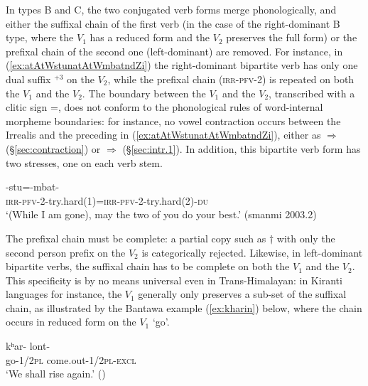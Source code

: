  In types B and C, the two conjugated verb forms merge phonologically, and either the suffixal chain of the first verb (in the case of the right-dominant B type, where the $V_1$ has a reduced form and the $V_2$ preserves the full form) or the prefixal chain of the second one (left-dominant) are removed.   For instance, in (\ref{ex:atAtWstunatAtWmbatndZi}) the right-dominant bipartite verb has only one dual suffix $^{+3}$ on the $V_2$, while the prefixal chain  (\textsc{irr}-\textsc{pfv}-2) is repeated on both the $V_1$ and the $V_2$. The boundary between the $V_1$ and the $V_2$, transcribed with a clitic sign =, does not conform to the phonological rules of word-internal morpheme boundaries: for instance, no vowel contraction occurs between the Irrealis  and the preceding  in (\ref{ex:atAtWstunatAtWmbatndZi}), either as  $\Rightarrow$  (§\ref{sec:contraction}) or  $\Rightarrow$   (§\ref{sec:intr.1}). In addition, this bipartite verb form has two stresses, one on each verb stem. 
  
\begin{exe}
\ex \label{ex:atAtWstunatAtWmbatndZi}
\gll {}-stu=-mbat-  \\
\textsc{irr}-\textsc{pfv}-\textsc{2}-try.hard(1)=\textsc{irr}-\textsc{pfv}-\textsc{2}-try.hard(2)-\textsc{du} \\
\glt `(While I am gone),  may the two of you do your best.' (smanmi 2003.2)
\end{exe} 

The prefixal chain must be complete: a partial copy such as $\dagger$ with only the second person  prefix on the $V_2$ is categorically rejected. Likewise, in left-dominant bipartite verbs, the suffixal chain has to be complete on both the $V_1$ and the $V_2$. This specificity is by no means universal even in Trans-Himalayan: in Kiranti languages  for instance, the $V_1$ generally only preserves a sub-set of the suffixal chain, as illustrated by the Bantawa example (\ref{ex:kharin}) below, where the chain  occurs in reduced form  on the $V_1$  `go'.
 
 
 \begin{exe}
\ex  \label{ex:kharin}
\gll kʰar- lont-  \\
go-\textsc{1/2pl} come.out-\textsc{1/2pl-excl} \\
\glt `We shall rise again.' (\citealt[254]{doornenbal09})
\end{exe} 
 
